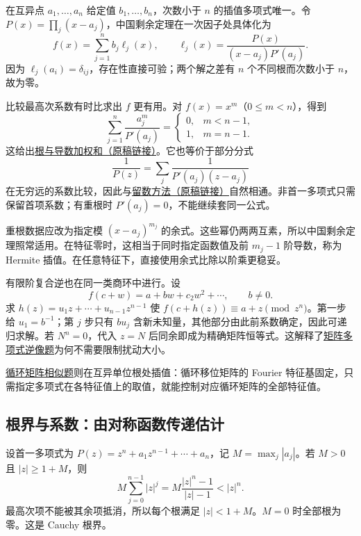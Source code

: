 \documentclass[12pt,fontset=fandol]{ctexart}
\begin{document}
\label{app:algebra-interpolation}

在互异点 $a_1,\ldots,a_n$ 给定值 $b_1,\ldots,b_n$，次数小于 $n$ 的插值多项式唯一。令 $P(x)=\prod_j(x-a_j)$，中国剩余定理在一次因子处具体化为
\[
f(x)=\sum_{j=1}^nb_j\ell_j(x),\qquad
\ell_j(x)=\frac{P(x)}{(x-a_j)P'(a_j)}.
\]
因为 $\ell_j(a_i)=\delta_{ij}$，存在性直接可验；两个解之差有 $n$ 个不同根而次数小于 $n$，故为零。

比较最高次系数有时比求出 $f$ 更有用。对 $f(x)=x^m$（$0\le m<n$），得到
\[
\sum_{j=1}^n\frac{a_j^m}{P'(a_j)}
=\begin{cases}0,&m<n-1,\\1,&m=n-1.\end{cases}
\]
这给出\href{https://github.com/lzxcr/cmc-mathematics/blob/64916fa1fdbc3e444a652eca204d5669058ee321/src/problems/finals/15/11.md}{根与导数加权和（原稿链接）}。它也等价于部分分式
\[
\frac1{P(z)}=\sum_j\frac1{P'(a_j)(z-a_j)}
\]
在无穷远的系数比较，因此与\href{https://github.com/lzxcr/cmc-mathematics/blob/64916fa1fdbc3e444a652eca204d5669058ee321/src/methods/inner/08-complex.md}{留数方法（原稿链接）}自然相通。非首一多项式只需保留首项系数；有重根时 $P'(a_j)=0$，不能继续套同一公式。

重根数据应改为指定模 $(x-a_j)^{m_j}$ 的余式。这些幂仍两两互素，所以中国剩余定理照常适用。在特征零时，这相当于同时指定函数值及前 $m_j-1$ 阶导数，称为 Hermite 插值。在任意特征下，直接使用余式比除以阶乘更稳妥。

有限阶复合逆也在同一类商环中进行。设
\[
f(c+w)=a+bw+c_2w^2+\cdots,\qquad b\ne0.
\]
求 $h(z)=u_1z+\cdots+u_{n-1}z^{n-1}$ 使 $f(c+h(z))\equiv a+z\pmod{z^n}$。第一步给 $u_1=b^{-1}$；第 $j$ 步只有 $bu_j$ 含新未知量，其他部分由此前系数确定，因此可递归求解。若 $N^n=0$，代入 $z=N$ 后同余即成为精确矩阵恒等式。这解释了\hyperref[pr:fin14-high:6]{矩阵多项式逆像题}为何不需要限制扰动大小。

\hyperref[pr:fin14-low:8]{循环矩阵相似题}则在互异单位根处插值：循环移位矩阵的 Fourier 特征基固定，只需指定多项式在各特征值上的取值，就能控制对应循环矩阵的全部特征值。

\subsection{根界与系数：由对称函数传递估计}

\label{app:algebra-roots}

设首一多项式为 $P(z)=z^n+a_1z^{n-1}+\cdots+a_n$，记 $M=\max_j|a_j|$。若 $M>0$ 且 $|z|\ge1+M$，则
\[
M\sum_{j=0}^{n-1}|z|^j
=M\frac{|z|^n-1}{|z|-1}<|z|^n.
\]
最高次项不能被其余项抵消，所以每个根满足 $|z|<1+M$。$M=0$ 时全部根为零。这是 Cauchy 根界。
\end{document}
